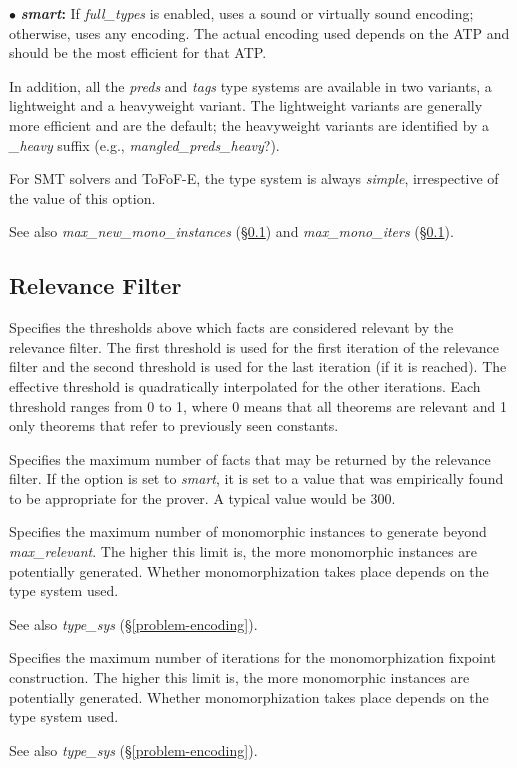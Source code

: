 \documentclass[a4paper,12pt]{article}
\begin{document}
\begin{enum}
\begin{enum}
\item[$\bullet$] \textbf{\textit{smart}:} If \textit{full\_types} is enabled,
uses a sound or virtually sound encoding; otherwise, uses any encoding. The actual
encoding used depends on the ATP and should be the most efficient for that ATP.
\end{enum}

In addition, all the \textit{preds} and \textit{tags} type systems are available
in two variants, a lightweight and a heavyweight variant. The lightweight
variants are generally more efficient and are the default; the heavyweight
variants are identified by a \textit{\_heavy} suffix (e.g.,
\textit{mangled\_preds\_heavy}{?}).

For SMT solvers and ToFoF-E, the type system is always \textit{simple},
irrespective of the value of this option.

\nopagebreak
{\small See also \textit{max\_new\_mono\_instances} (\S\ref{relevance-filter})
and \textit{max\_mono\_iters} (\S\ref{relevance-filter}).}
\end{enum}

\subsection{Relevance Filter}
\label{relevance-filter}

\begin{enum}
Specifies the thresholds above which facts are considered relevant by the
relevance filter. The first threshold is used for the first iteration of the
relevance filter and the second threshold is used for the last iteration (if it
is reached). The effective threshold is quadratically interpolated for the other
iterations. Each threshold ranges from 0 to 1, where 0 means that all theorems
are relevant and 1 only theorems that refer to previously seen constants.

Specifies the maximum number of facts that may be returned by the relevance
filter. If the option is set to \textit{smart}, it is set to a value that was
empirically found to be appropriate for the prover. A typical value would be
300.

Specifies the maximum number of monomorphic instances to generate beyond
\textit{max\_relevant}. The higher this limit is, the more monomorphic instances
are potentially generated. Whether monomorphization takes place depends on the
type system used.

\nopagebreak
{\small See also \textit{type\_sys} (\S\ref{problem-encoding}).}

Specifies the maximum number of iterations for the monomorphization fixpoint
construction. The higher this limit is, the more monomorphic instances are
potentially generated. Whether monomorphization takes place depends on the
type system used.

\nopagebreak
{\small See also \textit{type\_sys} (\S\ref{problem-encoding}).}
\end{enum}
\end{document}

